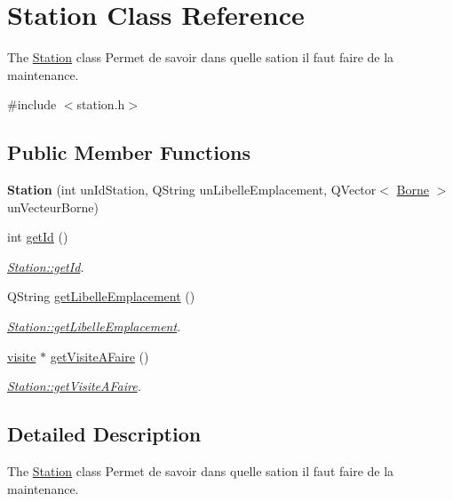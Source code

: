 \hypertarget{class_station}{}\section{Station Class Reference}
\label{class_station}


The \hyperlink{class_station}{Station} class Permet de savoir dans qu\textquotesingle{}elle sation il faut faire de la maintenance.  




{\ttfamily \#include $<$station.\+h$>$}

\subsection*{Public Member Functions}
\begin{DoxyCompactItemize}
\item 
\mbox{\label{class_station_ab3ce87c57bdf6c30fa057764a195c4a3}} 
{\bfseries Station} (int un\+Id\+Station, Q\+String un\+Libelle\+Emplacement, Q\+Vector$<$ \hyperlink{class_borne}{Borne} $>$ un\+Vecteur\+Borne)
\item 
int \hyperlink{class_station_a55b1b6e24c949165ca96d038125b72a6}{get\+Id} ()
\begin{DoxyCompactList}\small\item\em \hyperlink{class_station_a55b1b6e24c949165ca96d038125b72a6}{Station\+::get\+Id}. \end{DoxyCompactList}\item 
Q\+String \hyperlink{class_station_a6d4fa8bd0c2afa28aae831cd04938394}{get\+Libelle\+Emplacement} ()
\begin{DoxyCompactList}\small\item\em \hyperlink{class_station_a6d4fa8bd0c2afa28aae831cd04938394}{Station\+::get\+Libelle\+Emplacement}. \end{DoxyCompactList}\item 
\hyperlink{classvisite}{visite} $\ast$ \hyperlink{class_station_a0f0c47ed8e52e6d506c50512b915049a}{get\+Visite\+A\+Faire} ()
\begin{DoxyCompactList}\small\item\em \hyperlink{class_station_a0f0c47ed8e52e6d506c50512b915049a}{Station\+::get\+Visite\+A\+Faire}. \end{DoxyCompactList}\end{DoxyCompactItemize}


\subsection{Detailed Description}
The \hyperlink{class_station}{Station} class Permet de savoir dans qu\textquotesingle{}elle sation il faut faire de la maintenance. 

